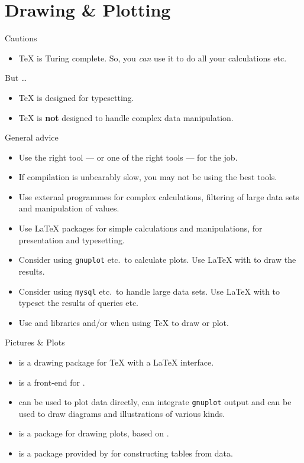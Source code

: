 \section{Drawing \& Plotting}

\begin{frame}{Cautions}
  \begin{itemize}
    \item \TeX{} is Turing complete.
    So, you \emph{can} use it to do all your calculations etc.
  \end{itemize}
  But \dots
  \begin{itemize}
    \item \TeX{} is designed for typesetting.
    \item \TeX{} is \textbf{not} designed to handle complex data manipulation.
  \end{itemize}
\end{frame}
\begin{frame}[fragile]{General advice}
  \begin{itemize}
    \item Use the right tool --- or one of the right tools --- for the job.
    \item If compilation is unbearably slow, you may not be using the best tools.
    \item Use external programmes for complex calculations, filtering of large data sets and manipulation of values.
    \item Use \LaTeX{} packages for simple calculations and manipulations, for presentation and typesetting.
    \item Consider using \verb|gnuplot| etc.\ to calculate plots.
    Use \LaTeX{} with \pgf{} to draw the results.
    \item Consider using \verb|mysql| etc.\ to handle large data sets.
    Use \LaTeX{} with  to typeset the results of queries etc.
    \item Use \Tikz{} and \pgfplots{}  libraries and/or  when using \TeX{} to draw or plot.
  \end{itemize}
\end{frame}
\begin{frame}[fragile]{Pictures \& Plots}
  \begin{itemize}
    \item \alert<1>{\pgf{}} is a drawing package for \TeX{} with a \LaTeX{} interface.
    \item \alert<1>{\Tikz{}} is a front-end for \pgf{}.
    \item \tikzpgf{} can be used to plot data directly, can integrate \verb|gnuplot| output and can be used to draw diagrams and illustrations of various kinds.
    \item \alert{\pgfplots{}} is a package for drawing plots, based on \tikzpgf{}.
    \item \alert{\pgfplotstable{}} is a package provided by \pgfplots{} for constructing tables from data.
  \end{itemize}
\end{frame}

